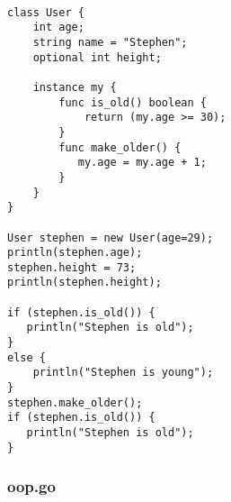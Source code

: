 \begin{verbatim}

class User {
    int age;
    string name = "Stephen";
    optional int height;

    instance my {
        func is_old() boolean {
            return (my.age >= 30);
        }
        func make_older() {
           my.age = my.age + 1;
        }
    }
}

User stephen = new User(age=29);
println(stephen.age);
stephen.height = 73;
println(stephen.height);

if (stephen.is_old()) {
   println("Stephen is old");
}
else {
    println("Stephen is young");
}
stephen.make_older();
if (stephen.is_old()) {
   println("Stephen is old");
}

\end{verbatim}

\subsubsection*{oop.go}

